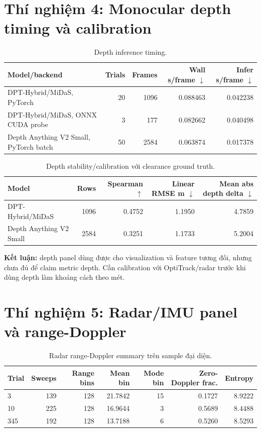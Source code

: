 \documentclass[10pt,a4paper]{article}
\begin{document}
\section{Thí nghiệm 4: Monocular depth timing và calibration}

\begin{table}[H]
\centering
\small
\caption{Depth inference timing.}
\begin{tabular}{lrrrr}
\toprule
Model/backend & Trials & Frames & Wall s/frame $\downarrow$ & Infer s/frame $\downarrow$ \\
\midrule
DPT-Hybrid/MiDaS, PyTorch & 20 & 1096 & 0.088463 & 0.042238 \\
DPT-Hybrid/MiDaS, ONNX CUDA probe & 3 & 177 & 0.082662 & 0.040498 \\
Depth Anything V2 Small, PyTorch batch & 50 & 2584 & 0.063874 & 0.017378 \\
\bottomrule
\end{tabular}
\end{table}

\begin{table}[H]
\centering
\small
\caption{Depth stability/calibration với clearance ground truth.}
\begin{tabular}{lrrrr}
\toprule
Model & Rows & Spearman $\uparrow$ & Linear RMSE m $\downarrow$ & Mean abs depth delta $\downarrow$ \\
\midrule
DPT-Hybrid/MiDaS & 1096 & 0.4752 & 1.1950 & 4.7859 \\
Depth Anything V2 Small & 2584 & 0.3251 & 1.1733 & 5.2004 \\
\bottomrule
\end{tabular}
\end{table}

\textbf{Kết luận:} depth panel dùng được cho visualization và feature tương đối, nhưng chưa đủ để claim metric depth. Cần calibration với OptiTrack/radar trước khi dùng depth làm khoảng cách theo mét.

\section{Thí nghiệm 5: Radar/IMU panel và range-Doppler}

\begin{table}[H]
\centering
\small
\caption{Radar range-Doppler summary trên sample đại diện.}
\begin{tabular}{lrrrrrr}
\toprule
Trial & Sweeps & Range bins & Mean bin & Mode bin & Zero-Doppler frac. & Entropy \\
\midrule
3 & 139 & 128 & 21.7842 & 15 & 0.1727 & 8.9222 \\
10 & 225 & 128 & 16.9644 & 3 & 0.5689 & 8.4488 \\
345 & 192 & 128 & 13.7188 & 6 & 0.5260 & 8.5293 \\
\bottomrule
\end{tabular}
\end{table}
\end{document}
